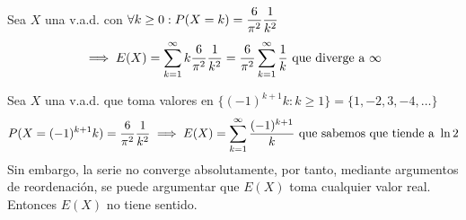 \begin{ejem}
	Sea $X$ una v.a.d. con $\displaystyle \forall k \geq 0 : P(X=k)=\frac{6}{\pi^2}\frac{1}{k^2}$
	\[\implies E(X)=\sum_{k=1}^\infty k\frac{6}{\pi^2}\frac{1}{k^2}=\frac{6}{\pi^2}\sum_{k=1}^\infty \frac{1}{k} \text{  que diverge a } \infty\]
\end{ejem}
\begin{ejem}
	Sea $X$ una v.a.d. que toma valores en $\{(-1)^{k+1}k : k \geq 1\} = \{1, -2, 3, -4, \dots\}$
	\[P(X=(-1)^{k+1}k)=\frac{6}{\pi^2}\frac{1}{k^2} \implies E(X)=\sum_{k=1}^\infty \frac{(-1)^{k+1}}{k} \text{ que sabemos que tiende a } \ln{2}\]
	Sin embargo, la serie no converge absolutamente, por tanto, mediante argumentos
	de reordenación, se puede argumentar que $E(X)$ toma cualquier valor real.
	Entonces $E(X)$ no tiene sentido.
\end{ejem}

